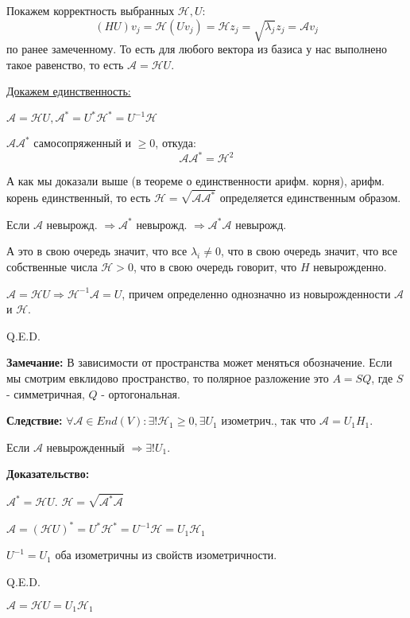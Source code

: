 Покажем корректность выбранных $\mathcal{H},U$:
$$(HU)v_j = \mathcal{H}(U v_j) = \mathcal{H}z_j =\sqrt{\lambda_j}z_j = \mathcal{A}v_j$$
по ранее замеченному. То есть для любого вектора из базиса у нас выполнено такое равенство, то есть $\mathcal{A} = \mathcal{H} U$.

\uline{Докажем единственность:} 

$\mathcal{A} = \mathcal{H} U, \mathcal{A}^* = U^* \mathcal{H}^* = U^{-1}\mathcal{H}$

$\mathcal{A}\mathcal{A}^*$ самосопряженный и $\geq 0$, откуда:
$$\mathcal{A}\mathcal{A}^* = \mathcal{H}^2 $$

А как мы доказали выше (в теореме о единственности арифм. корня), арифм. корень единственный, то есть $\mathcal{H} = \sqrt{\mathcal{A A}^*}$ определяется единственным образом.

Если $\mathcal{A}$ невырожд. $\Rightarrow \mathcal{A}^*$ невырожд. $\Rightarrow \mathcal{A}^* \mathcal{A}$ невырожд.

А это в свою очередь значит, что все $\lambda_i \neq 0$, что  в свою очередь значит, что все собственные числа $\mathcal{H} >0$, что в свою очередь говорит, что $H$ невырожденно.

$\mathcal{A} = \mathcal{H}U \Rightarrow \mathcal{H}^{-1}\mathcal{A} = U$, причем определенно однозначно из новырожденности $\mathcal{A}$ и $\mathcal{H}$.


\hfill Q.E.D.

\textbf{Замечание:} В зависимости от пространства может меняться обозначение. Если мы смотрим евклидово пространство, то полярное разложение это $A = SQ$, где $S$ - симметричная, $Q$ - ортогональная. 

\textbf{Следствие:} $\forall \mathcal{A}\in End(V): \exists! \mathcal{H}_1 \geq 0, \exists U_1$ изометрич., так что $\mathcal{A} = U_1H_1$.

Если $\mathcal{A}$ невырожденный $\Rightarrow \exists! U_1$.

\textbf{Доказательство:}

$\mathcal{A}^* = \mathcal{H}U$. $\mathcal{H} = \sqrt{\mathcal{A}^*\mathcal{A}}$

$\mathcal{A} = (\mathcal{H}U)^* = U^* \mathcal{H}^* = U^{-1}\mathcal{H} = U_1\mathcal{H}_1$

$U^{-1} = U_1$ оба изометричны из свойств изометричности.

\hfill Q.E.D.

$\mathcal{A} = \mathcal{H} U = U_1 \mathcal{H}_1$

